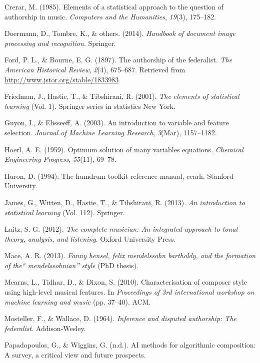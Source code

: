 \documentclass[12pt,twoside]{reedthesis}
\theoremstyle{definition}
\theoremstyle{definition}
\theoremstyle{definition}
\theoremstyle{remark}
\begin{document}
\hypertarget{ref-crerar}{}
Crerar, M. (1985). Elements of a statistical approach to the question of
authorship in music. \emph{Computers and the Humanities}, \emph{19}(3),
175--182.

\hypertarget{ref-OMR}{}
Doermann, D., Tombre, K., \& others. (2014). \emph{Handbook of document
image processing and recognition}. Springer.

\hypertarget{ref-authorshipfed}{}
Ford, P. L., \& Bourne, E. G. (1897). The authorship of the federalist.
\emph{The American Historical Review}, \emph{2}(4), 675--687. Retrieved
from \url{http://www.jstor.org/stable/1833983}

\hypertarget{ref-esl}{}
Friedman, J., Hastie, T., \& Tibshirani, R. (2001). \emph{The elements
of statistical learning} (Vol. 1). Springer series in statistics New
York.

\hypertarget{ref-guyon2003}{}
Guyon, I., \& Elisseeff, A. (2003). An introduction to variable and
feature selection. \emph{Journal of Machine Learning Research},
\emph{3}(Mar), 1157--1182.

\hypertarget{ref-hoer}{}
Hoerl, A. E. (1959). Optimum solution of many variables equations.
\emph{Chemical Engineering Progress}, \emph{55}(11), 69--78.

\hypertarget{ref-huron1994humdrum}{}
Huron, D. (1994). The humdrum toolkit reference manual, ccarh. Stanford
University.

\hypertarget{ref-isl}{}
James, G., Witten, D., Hastie, T., \& Tibshirani, R. (2013). \emph{An
introduction to statistical learning} (Vol. 112). Springer.

\hypertarget{ref-laitz}{}
Laitz, S. G. (2012). \emph{The complete musician: An integrated approach
to tonal theory, analysis, and listening}. Oxford University Press.

\hypertarget{ref-mace2013}{}
Mace, A. R. (2013). \emph{Fanny hensel, felix mendelssohn bartholdy, and
the formation of the`` mendelssohnian'' style} (PhD thesis).

\hypertarget{ref-mearns2010}{}
Mearns, L., Tidhar, D., \& Dixon, S. (2010). Characterisation of
composer style using high-level musical features. In \emph{Proceedings
of 3rd international workshop on machine learning and music} (pp.
37--40). ACM.

\hypertarget{ref-mosteller1964inference}{}
Mosteller, F., \& Wallace, D. (1964). \emph{Inference and disputed
authorship: The federalist}. Addison-Wesley.

\hypertarget{ref-papadopoulosai}{}
Papadopoulos, G., \& Wiggins, G. (n.d.). AI methods for algorithmic
composition: A survey, a critical view and future prospects.
\end{document}
